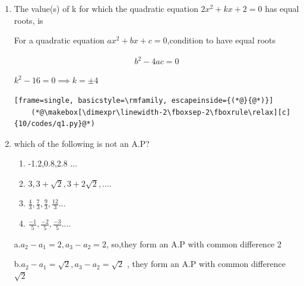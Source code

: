 \begin{enumerate}[label=\thesubsection.\arabic*, ref=\thesubsection.\theenumi]
	
	
	\item The value(s) of k for which the quadratic equation $2x^2 + kx + 2 = 0$ has equal roots, is
	\begin{enumerate}
	\end{enumerate}
	
	\solution 
	
	For a quadratic equation $ ax^2+bx+c=0$,condition to have equal roots 
	
	
	\begin{align}
		b^2-4ac=0    
	\end{align}
	
	$k^2-16=0 \implies k=\pm 4$
	
\begin{lstlisting}[frame=single, basicstyle=\rmfamily, escapeinside={(*@}{@*)}]
	(*@\makebox[\dimexpr\linewidth-2\fboxsep-2\fboxrule\relax][c]{10/codes/q1.py}@*)
\end{lstlisting}
	\item which of the following is not an A.P?
	\begin{enumerate}
		
		
		\item -1.2,0.8,2.8 ...
		
		\item$3,3+\sqrt{2},3+2\sqrt{2},....$
		
		\item$\frac{4}{3},\frac{7}{3},\frac{9}{3},\frac{12}{3}...$
		
		\item$\frac{-1}{5},\frac{-2}{5},\frac{-3}{5}....$
		
		
	\end{enumerate}
	\solution 
	
	a.$a_2-a_1= 2,a_3-a_2=2 $, so,they form an A.P with common difference 2
	
	b.$a_2-a_1=\sqrt{2}, a_3-a_2=\sqrt{2}$ , they form an A.P with common difference $\sqrt{2}$
	

\end{enumerate}
